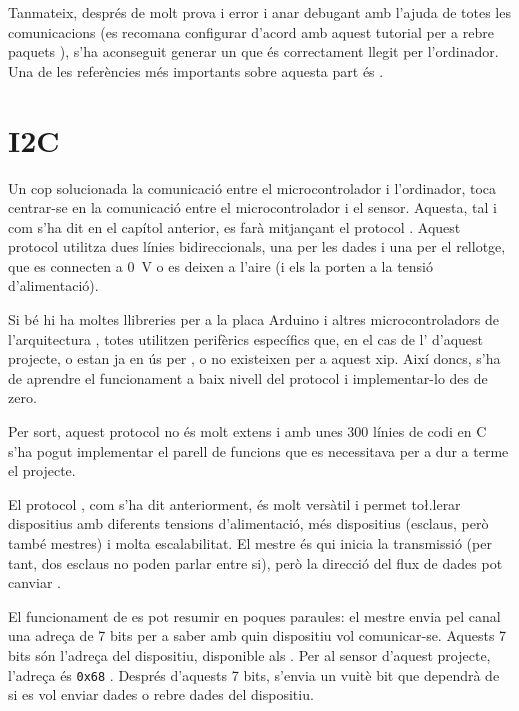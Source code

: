 Tanmateix, després de molt prova i error i anar debugant amb l'ajuda de
 totes les comunicacions (es recomana configurar 
d'acord amb aquest tutorial per a rebre paquets 
\cite{InstallWireshark}), s'ha aconseguit
generar un  que és correctament llegit per l'ordinador.
Una de les referències més importants sobre aquesta part és \cite{VusbProjects}.

\section{I2C}

Un cop solucionada la comunicació entre el microcontrolador i l'ordinador, toca
centrar-se en la comunicació entre el microcontrolador i el sensor. Aquesta, tal
i com s'ha dit en el capítol anterior, es farà mitjançant el protocol .
Aquest protocol utilitza dues línies bidireccionals, una per les dades i una per
el rellotge, que es connecten a \SI[round-mode=places,round-precision=0]{0}{\volt}
o es deixen a l'aire (i els  la porten a la tensió d'alimentació).

Si bé hi ha moltes llibreries per a la placa Arduino i altres microcontroladors
de l'arquitectura , totes utilitzen perifèrics específics que, en el
cas de l' d'aquest projecte, o estan ja en ús per , o
no existeixen per a aquest xip. Així doncs, s'ha de aprendre el funcionament a
baix nivell del protocol i implementar-lo des de zero.

Per sort, aquest protocol no és molt extens i amb unes 300 línies de codi en C
s'ha pogut implementar el parell de funcions que es necessitava per a dur a
terme el projecte.

El protocol , com s'ha dit anteriorment, és molt versàtil i permet 
to\l.lerar dispositius amb diferents tensions d'alimentació, més dispositius
(esclaus, però també mestres) i molta escalabilitat. El mestre és qui inicia
la transmissió (per tant, dos esclaus no poden parlar entre si), però la
direcció del flux de dades pot canviar \cite{I2c}.

El funcionament de  es pot resumir en poques paraules: el mestre envia
pel canal una adreça de 7 bits per a saber amb quin dispositiu vol comunicar-se.
Aquests 7 bits són l'adreça del dispositiu, disponible als . Per
al sensor d'aquest projecte, l'adreça és \texttt{0x68} \cite{MPU6050reg}.
Després d'aquests 7 bits,
s'envia un vuitè bit que dependrà de si es vol enviar dades o rebre dades del
dispositiu.

